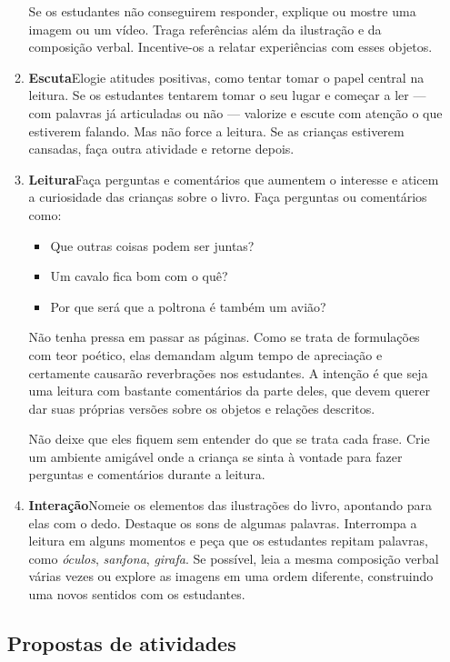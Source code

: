 \documentclass[11pt]{extarticle}
\begin{document}
\begin{enumerate}
\begin{enumerate}
Se os estudantes não conseguirem responder, explique ou mostre uma 
imagem ou um vídeo. Traga referências além da ilustração e da composição verbal. 
Incentive-os a relatar experiências com esses objetos.

\item \textbf{Escuta}\quad Elogie atitudes positivas, como 
tentar tomar o papel central na leitura. Se os estudantes tentarem 
tomar o seu lugar e começar a ler --- com palavras já articuladas 
ou não --- valorize e escute com atenção o que estiverem falando. Mas não 
force a leitura. Se as crianças estiverem cansadas, faça outra atividade 
e retorne depois. 

\item \textbf{Leitura}\quad Faça perguntas e comentários que aumentem o 
interesse e aticem a curiosidade das crianças sobre o livro. Faça 
perguntas ou comentários como: 

\begin{itemize}
\item Que outras coisas podem ser juntas?
\item Um cavalo fica bom com o quê?
\item Por que será que a poltrona é também um avião?
\end{itemize}

Não tenha pressa em passar as páginas. Como se trata de formulações
com teor poético, elas demandam algum tempo de apreciação
e certamente causarão reverbrações nos estudantes. 
A intenção é que seja uma leitura com bastante comentários
da parte deles, que devem querer dar suas próprias versões
sobre os objetos e relações descritos.  

Não deixe que eles fiquem sem entender do que se trata cada frase. Crie 
um ambiente amigável onde a criança se sinta à vontade para fazer 
perguntas e comentários durante a leitura.


\item \textbf{Interação}\quad Nomeie os elementos das ilustrações 
do livro, apontando para elas com o dedo. Destaque os sons de algumas 
palavras. Interrompa a leitura em alguns momentos e peça que 
os estudantes repitam palavras, como \textit{óculos}, \textit{sanfona}, \textit{girafa}. Se possível, 
leia a mesma composição verbal várias vezes ou explore as imagens em uma ordem 
diferente, construindo uma novos sentidos com os estudantes. 
\end{enumerate}


\subsection{Propostas de atividades}


\end{enumerate}
\end{document}
